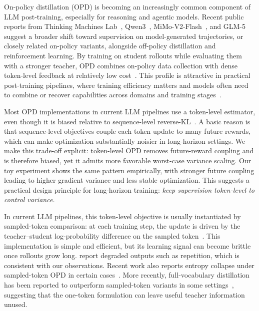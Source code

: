 \documentclass{article}
\begin{document}
On-policy distillation (OPD) is becoming an increasingly common component of LLM post-training, especially for reasoning and agentic models. Recent public reports from Thinking Machines Lab~\citep{tmlopd2025}, Qwen3~\citep{qwen3_2025}, MiMo-V2-Flash~\citep{mimo_v2_flash_2026}, and GLM-5~\citep{glm5_2026} suggest a broader shift toward supervision on model-generated trajectories, or closely related on-policy variants, alongside off-policy distillation and reinforcement learning. By training on student rollouts while evaluating them with a stronger teacher, OPD combines on-policy data collection with dense token-level feedback at relatively low cost~\citep{opd2023,minillm2023}. This profile is attractive in practical post-training pipelines, where training efficiency matters and models often need to combine or recover capabilities across domains and training stages~\citep{mimo_v2_flash_2026,glm5_2026,wang2026mix,deepseekai2026deepseekv4}.

Most OPD implementations in current LLM pipelines use a token-level estimator, even though it is biased relative to sequence-level reverse-KL~\citep{tmlopd2025}. A basic reason is that sequence-level objectives couple each token update to many future rewards, which can make optimization substantially noisier in long-horizon settings. We make this trade-off explicit: token-level OPD removes future-reward coupling and is therefore biased, yet it admits more favorable worst-case variance scaling. Our toy experiment shows the same pattern empirically, with stronger future coupling leading to higher gradient variance and less stable optimization. This suggests a practical design principle for long-horizon training: \textit{keep supervision token-level to control variance.}

In current LLM pipelines, this token-level objective is usually instantiated by sampled-token comparison: at each training step, the update is driven by the teacher--student log-probability difference on the sampled token~\citep{tmlopd2025,mimo_v2_flash_2026}. This implementation is simple and efficient, but its learning signal can become brittle once rollouts grow long. \citet{minillm2023} report degraded outputs such as repetition, which is consistent with our observations. Recent work also reports entropy collapse under sampled-token OPD in certain cases~\citep{ko2026reopold,jin2026eopd}. More recently, full-vocabulary distillation has been reported to outperform sampled-token variants in some settings~\citep{zhao2026opsd,deepseekai2026deepseekv4}, suggesting that the one-token formulation can leave useful teacher information unused.
\end{document}
